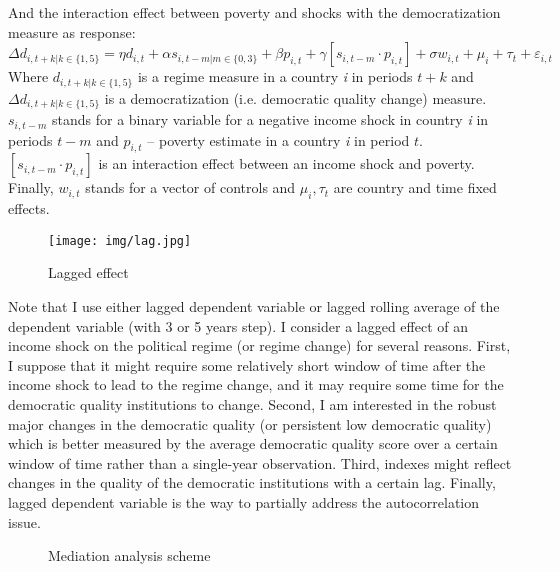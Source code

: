 \documentclass[a4paper, 12pt]{article}
\begin{document}
    \noindent And the interaction effect between poverty and shocks with the democratization measure as response:
    \begin{equation}\label{democ}
        \Delta d_{i, t+k|k\in\{1,5\}}= \eta d_{i,t}+ \alpha s_{i,t-m|m\in\{0,3\}}+\beta p_{i,t}+\gamma[s_{i,t-m} \cdot p_{i,t}]+\sigma w_{i,t}+\mu_i+\tau_t +\varepsilon_{i,t}
    \end{equation}
    \noindent Where $d_{i, t+k|k\in\{1,5\}}$ is a regime measure in a country \textit{i} in periods $t+k$ and $\Delta d_{i, t+k|k\in\{1,5\}}$ is a democratization (i.e. democratic quality change) measure. $s_{i,t-m}$ stands for a binary variable for a negative income shock in country \textit{i} in periods $t-m$ and  $p_{i,t}$ -- poverty estimate in a country \textit{i} in period $t$. $[s_{i,t-m} \cdot p_{i,t}]$ is an interaction effect between an income shock and poverty. Finally, $w_{i,t}$ stands for a vector of controls and $\mu_i, \tau_t$ are country and time fixed effects.
    \\
    \begin{figure}[h]
	    \centering
	    \texttt{[image: img/lag.jpg]}
	    \caption{Lagged effect}
	    \label{fig:lag}
	\end{figure}
	
    \noindent Note that I use either lagged dependent variable or lagged rolling average of the dependent variable (with 3 or 5 years step). I consider a lagged effect of an income shock on the political regime (or regime change) for several reasons. First, I suppose that it might require some relatively short window of time after the income shock to lead to the regime change, and it may require some time for the democratic quality institutions to change. Second, I am interested in the robust major changes in the democratic quality (or persistent low democratic quality) which is better measured by the average democratic quality score over a certain window of time rather than a single-year observation. Third, indexes might reflect changes in the quality of the democratic institutions with a certain lag. Finally, lagged dependent variable is the way to partially address the autocorrelation issue.
    \\
        \begin{figure}[ht]
        \centering
        \caption{Mediation analysis scheme}
        \label{fig:mediation}
    \end{figure}
    
\end{document}

